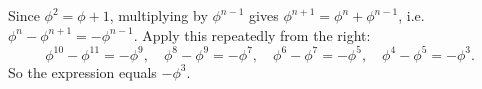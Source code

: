 Since $\phi^2=\phi+1$, multiplying by $\phi^{n-1}$ gives $\phi^{n+1}=\phi^n+\phi^{n-1}$, i.e. $\phi^n-\phi^{n+1}=-\phi^{n-1}$. Apply this repeatedly from the right:
\[\phi^{10}-\phi^{11}=-\phi^9,\quad\phi^8-\phi^9=-\phi^7,\quad\phi^6-\phi^7=-\phi^5,\quad\phi^4-\phi^5=-\phi^3.\]
So the expression equals $\boxed{-\phi^3}$.
